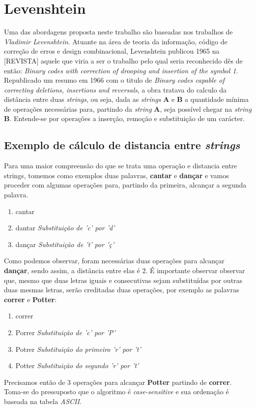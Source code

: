 \section{Levenshtein} %
\label{sec:leveinstein}

Uma das abordagens proposta neste trabalho são baseadas nos trabalhos de \textit{Vladimir Levenshtein}. Atuante na área de teoria da informação, código de correção de erros e design combinacional, Levenshtein publicou 1965 na [REVISTA] aquele que viria a ser o trabalho pelo qual seria reconhecido dês de então: \textit{Binary codes with correction of drooping and insertion of the symbol 1}\cite{levenshtein1965}. Republicado um resumo em 1966 com o titulo de \textit{Binary codes capable of correcting deletions, insertions and reversals}\cite{levenshtein1966}, a obra tratava do calculo da distância entre duas \textit{strings}, ou seja, dada as \textit{strings} \textbf{A} e \textbf{B} a quantidade mínima de operações necessárias para, partindo da \textit{string} \textbf{A}, seja possível chegar na \textit{string} \textbf{B}. Entende-se por operações a inserção, remoção e substituição de um carácter.

\subsection{Exemplo de cálculo de distancia entre \textit{strings}} %
\label{sub:exemplo_de_c_lculo_de_distancia_entre_it}

Para uma maior compreensão do que se trata uma operação e distancia entre strings, tomemos como exemplos duas palavras, \textbf{cantar} e \textbf{dançar} e vamos proceder com algumas operações para, partindo da primeira, alcançar a segunda palavra.


\begin{enumerate}[start=0]
	\item cantar
	\item dantar \textit{Substituição de 'c' por 'd'}
	\item dançar \textit{Substituição de 't' por 'ç'}
\end{enumerate}

Como podemos observar, foram necessárias duas operações para alcançar \textbf{dançar}, sendo assim, a distância entre elas é $2$.
É importante observar observar que, mesmo que duas letras iguais e consecutivas sejam substituídas por outras duas mesmas letras, serão creditadas duas operações, por exemplo as palavras \textbf{correr} e \textbf{Potter}:

\begin{enumerate}[start=0]
	\item correr
	\item Porrer \textit{Substituição de 'c' por 'P'}
	\item Potrer \textit{Substituição do primeiro 'r' por 't'}
	\item Potter \textit{Substituição do segundo 'r' por 't'}
\end{enumerate}

Precisamos então de 3 operações para alcançar \textbf{Potter} partindo de \textbf{correr}. Toma-se do pressuposto que o algoritmo é \textit{case-sensitive} e sua ordenação é baseada na tabela \textit{ASCII}.

